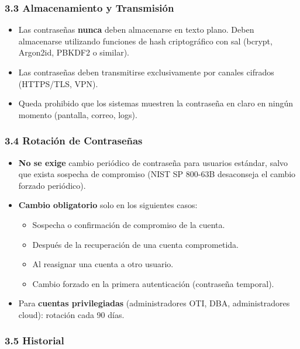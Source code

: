 \documentclass[10pt,letterpaper]{article}
\begin{document}
\subsubsection{3.3 Almacenamiento y
Transmisión}\label{almacenamiento-y-transmisiuxf3n}

\begin{itemize}
\tightlist
\item
  Las contraseñas \textbf{nunca} deben almacenarse en texto plano. Deben
  almacenarse utilizando funciones de hash criptográfico con sal
  (bcrypt, Argon2id, PBKDF2 o similar).
\item
  Las contraseñas deben transmitirse exclusivamente por canales cifrados
  (HTTPS/TLS, VPN).
\item
  Queda prohibido que los sistemas muestren la contraseña en claro en
  ningún momento (pantalla, correo, logs).
\end{itemize}

\subsubsection{3.4 Rotación de
Contraseñas}\label{rotaciuxf3n-de-contraseuxf1as}

\begin{itemize}
\tightlist
\item
  \textbf{No se exige} cambio periódico de contraseña para usuarios
  estándar, salvo que exista sospecha de compromiso (NIST SP 800-63B
  desaconseja el cambio forzado periódico).
\item
  \textbf{Cambio obligatorio} solo en los siguientes casos:

  \begin{itemize}
  \tightlist
  \item
    Sospecha o confirmación de compromiso de la cuenta.
  \item
    Después de la recuperación de una cuenta comprometida.
  \item
    Al reasignar una cuenta a otro usuario.
  \item
    Cambio forzado en la primera autenticación (contraseña temporal).
  \end{itemize}
\item
  Para \textbf{cuentas privilegiadas} (administradores OTI, DBA,
  administradores cloud): rotación cada 90 días.
\end{itemize}

\subsubsection{3.5 Historial}\label{historial}
\end{document}
